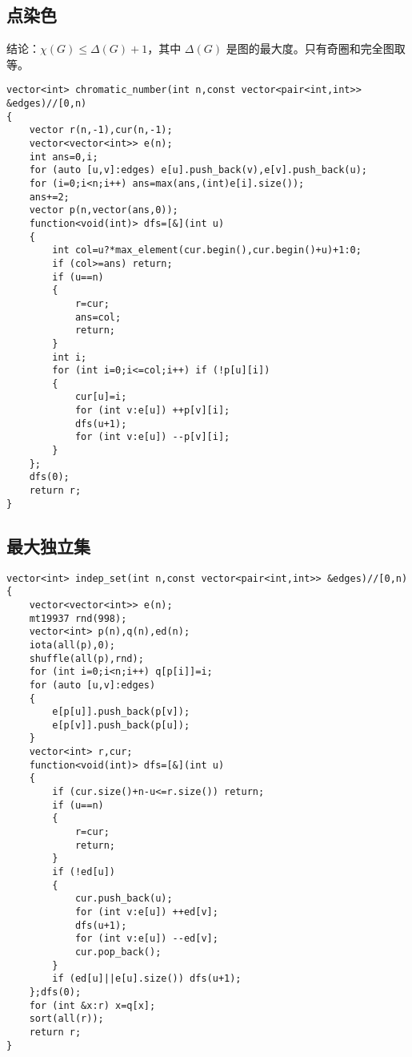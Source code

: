 \documentclass[12pt]{ctexart}
\begin{document}
\subsection{点染色}

结论：$\chi(G)\le \Delta(G)+1$，其中 $\Delta(G)$ 是图的最大度。只有奇圈和完全图取等。

\begin{lstlisting}
vector<int> chromatic_number(int n,const vector<pair<int,int>> &edges)//[0,n)
{
	vector r(n,-1),cur(n,-1);
	vector<vector<int>> e(n);
	int ans=0,i;
	for (auto [u,v]:edges) e[u].push_back(v),e[v].push_back(u);
	for (i=0;i<n;i++) ans=max(ans,(int)e[i].size());
	ans+=2;
	vector p(n,vector(ans,0));
	function<void(int)> dfs=[&](int u)
	{
		int col=u?*max_element(cur.begin(),cur.begin()+u)+1:0;
		if (col>=ans) return;
		if (u==n)
		{
			r=cur;
			ans=col;
			return;
		}
		int i;
		for (int i=0;i<=col;i++) if (!p[u][i])
		{
			cur[u]=i;
			for (int v:e[u]) ++p[v][i];
			dfs(u+1);
			for (int v:e[u]) --p[v][i];
		}
	};
	dfs(0);
	return r;
}
\end{lstlisting}

\subsection{最大独立集}

\begin{lstlisting}
vector<int> indep_set(int n,const vector<pair<int,int>> &edges)//[0,n)
{
	vector<vector<int>> e(n);
	mt19937 rnd(998);
	vector<int> p(n),q(n),ed(n);
	iota(all(p),0);
	shuffle(all(p),rnd);
	for (int i=0;i<n;i++) q[p[i]]=i;
	for (auto [u,v]:edges)
	{
		e[p[u]].push_back(p[v]);
		e[p[v]].push_back(p[u]);
	}
	vector<int> r,cur;
	function<void(int)> dfs=[&](int u)
	{
		if (cur.size()+n-u<=r.size()) return;
		if (u==n)
		{
			r=cur;
			return;
		}
		if (!ed[u])
		{
			cur.push_back(u);
			for (int v:e[u]) ++ed[v];
			dfs(u+1);
			for (int v:e[u]) --ed[v];
			cur.pop_back();
		}
		if (ed[u]||e[u].size()) dfs(u+1);
	};dfs(0);
	for (int &x:r) x=q[x];
	sort(all(r));
	return r;
}
\end{lstlisting}
\end{document}

